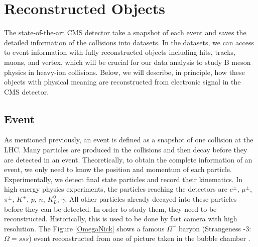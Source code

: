 \chapter{Reconstructed Objects}

The state-of-the-art CMS detector take a snapshot of each event and saves the detailed information of the collisions into datasets. In the datasets, we can access to event information with fully reconstructed objects including hits, tracks, muons, and vertex, which will be crucial for our data analysis to study B meson physics in heavy-ion collisions. Below, we will describe, in principle, how these objects with physical meaning are reconstructed from electronic signal in the CMS detector.

\section{Event}

As mentioned previously, an event is defined as a snapshot of one collision at the LHC. Many particles are produced in the collisions and then decay before they are detected in an event. Theoretically, to obtain the complete information of an event, we only need to know the position and momentum of each particle. Experimentally, we detect final state particles and record their kinematics. In high energy physics experiments, the particles reaching the detectors are $e^{\pm}$, $\mu^{\pm}$, $\pi^{\pm}$, $K^{\pm}$, $p$, $n$, $K^0_L$, $\gamma$. All other particles already decayed into these particles before they can be detected. In order to study them, they need to be reconstructed. Historically, this is used to be done by fast camera with high resolution. The Figure \ref{OmegaNick} shows a famous $\Omega^-$ baryon (Strangeness -3: $\Omega = sss$) event reconstructed from one of picture taken in the bubble chamber \cite{OmegaRef}.

